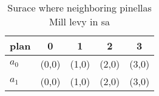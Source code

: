 \documentclass[a4paper]{article}
\begin{document}
\begin{table}
\begin{adjustbox}{width=0.6\columnwidth}
\begin{tabular}{|l|l|l|l|l|}
\hline
\textbf{plan} & \multicolumn{1}{c|}{\textbf{0}} & \multicolumn{1}{c|}{\textbf{1}} & \multicolumn{1}{c|}{\textbf{2}} & \multicolumn{1}{c|}{\textbf{3}} \\ \hline
\textbf{$a_0$}  & (0,0) & (1,0) & (2,0) & (3,0) \\ \hline
\textbf{$a_1$}  & (0,0) & (1,0) & (2,0) & (3,0) \\ \hline
\end{tabular}
\end{adjustbox}
\caption{Surace where neighboring pinellas Mill levy in sa
}
\end{table}
\end{document}
